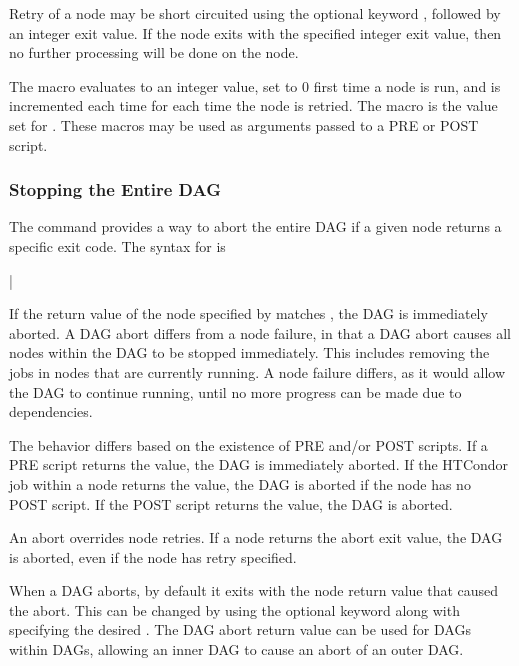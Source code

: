 Retry of a node may be short circuited using the
optional keyword , followed by an integer exit value.
If the node exits with the specified integer exit value,
then no further processing will be done
on the node. 

The macro  evaluates to an 
integer value, set to 0 first time a node is run,
and is incremented each time for each time the node is retried. 
The macro  is the value set for
.
These macros may be used as arguments passed to a PRE or POST script.

\subsubsection{\label{dagman:abort}Stopping the Entire DAG}

The  command provides a way
to abort the entire DAG if a given node returns a specific exit
code.  The syntax for  is

 | 

If the return value of the node specified by 
matches ,
the DAG is immediately aborted.
A DAG abort differs from a node failure,
in that a DAG abort causes all nodes within the DAG to be stopped immediately.
This includes removing the jobs in nodes that are currently running.
A node failure differs, as it would allow the DAG to continue running,
until no more progress can be made due to dependencies.

The behavior differs based on the existence of PRE and/or POST scripts.
If a PRE script returns the  value,
the DAG is immediately aborted.
If the HTCondor job within a node returns the  value,
the DAG is aborted if the node has no POST script.
If the POST script returns the  value, the DAG is aborted.

An abort overrides node retries. 
If a node returns the abort exit value,
the DAG is aborted,
even if the node has retry specified.

When a DAG aborts, by default it exits with the node return value that
caused the abort.  This can be changed by 
using  the optional  keyword along
with specifying the desired .
The DAG abort return value
can be used for DAGs within DAGs,
allowing an inner DAG to cause an abort of an outer DAG.

